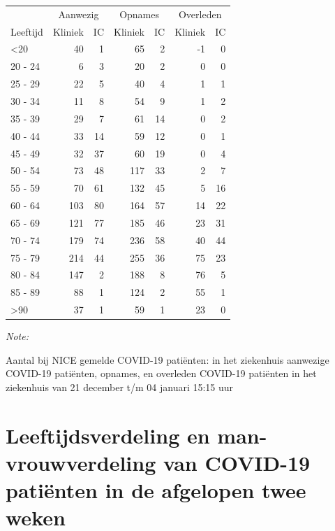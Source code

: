 \documentclass[
  english,
  man,floatsintext]{apa6}
\begin{document}
\begin{table}
\centering\begingroup\fontsize{10}{12}\selectfont

\begin{threeparttable}
\begin{tabular}{lrrrrrr}
\toprule
\multicolumn{1}{c}{ } & \multicolumn{2}{c}{Aanwezig} & \multicolumn{2}{c}{Opnames} & \multicolumn{2}{c}{Overleden} \\
\cmidrule(l{3pt}r{3pt}){2-3} \cmidrule(l{3pt}r{3pt}){4-5} \cmidrule(l{3pt}r{3pt}){6-7}
Leeftijd & Kliniek & IC & Kliniek & IC & Kliniek & IC\\
\midrule
<20 & 40 & 1 & 65 & 2 & -1 & 0\\
20 - 24 & 6 & 3 & 20 & 2 & 0 & 0\\
25 - 29 & 22 & 5 & 40 & 4 & 1 & 1\\
30 - 34 & 11 & 8 & 54 & 9 & 1 & 2\\
35 - 39 & 29 & 7 & 61 & 14 & 0 & 2\\
40 - 44 & 33 & 14 & 59 & 12 & 0 & 1\\
45 - 49 & 32 & 37 & 60 & 19 & 0 & 4\\
50 - 54 & 73 & 48 & 117 & 33 & 2 & 7\\
55 - 59 & 70 & 61 & 132 & 45 & 5 & 16\\
60 - 64 & 103 & 80 & 164 & 57 & 14 & 22\\
65 - 69 & 121 & 77 & 185 & 46 & 23 & 31\\
70 - 74 & 179 & 74 & 236 & 58 & 40 & 44\\
75 - 79 & 214 & 44 & 255 & 36 & 75 & 23\\
80 - 84 & 147 & 2 & 188 & 8 & 76 & 5\\
85 - 89 & 88 & 1 & 124 & 2 & 55 & 1\\
>90 & 37 & 1 & 59 & 1 & 23 & 0\\
\bottomrule
\end{tabular}
\begin{tablenotes}
\item \textit{Note: } 
\item Aantal bij NICE gemelde COVID-19 patiënten: in het ziekenhuis aanwezige COVID-19 patiënten, opnames, en overleden COVID-19 patiënten in het ziekenhuis van 21 december t/m 04 januari 15:15 uur
\end{tablenotes}
\end{threeparttable}
\endgroup{}
\end{table}

\newpage

\hypertarget{leeftijdsverdeling-en-man-vrouwverdeling-van-covid-19-patiuxebnten-in-de-afgelopen-twee-weken}{%
\section{Leeftijdsverdeling en man-vrouwverdeling van COVID-19 patiënten in de afgelopen twee weken}\label{leeftijdsverdeling-en-man-vrouwverdeling-van-covid-19-patiuxebnten-in-de-afgelopen-twee-weken}}
\end{document}
